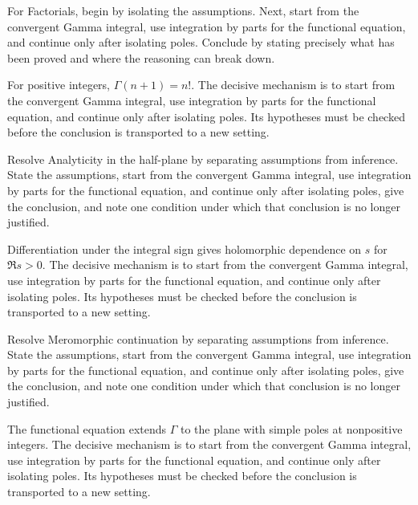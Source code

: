 \begin{problem}\label{prob:iv19-problem-04}
For Factorials, begin by isolating the assumptions. Next, start from the convergent Gamma integral, use integration by parts for the functional equation, and continue only after isolating poles. Conclude by stating precisely what has been proved and where the reasoning can break down.
\end{problem}
\begin{solution}
For positive integers, $\Gamma(n+1)=n!$. The decisive mechanism is to start from the convergent Gamma integral, use integration by parts for the functional equation, and continue only after isolating poles. Its hypotheses must be checked before the conclusion is transported to a new setting.
\end{solution}

\begin{problem}\label{prob:iv19-problem-05}
Resolve Analyticity in the half-plane by separating assumptions from inference. State the assumptions, start from the convergent Gamma integral, use integration by parts for the functional equation, and continue only after isolating poles, give the conclusion, and note one condition under which that conclusion is no longer justified.
\end{problem}
\begin{solution}
Differentiation under the integral sign gives holomorphic dependence on $s$ for $\Re s>0$. The decisive mechanism is to start from the convergent Gamma integral, use integration by parts for the functional equation, and continue only after isolating poles. Its hypotheses must be checked before the conclusion is transported to a new setting.
\end{solution}

\begin{problem}\label{prob:iv19-problem-06}
Resolve Meromorphic continuation by separating assumptions from inference. State the assumptions, start from the convergent Gamma integral, use integration by parts for the functional equation, and continue only after isolating poles, give the conclusion, and note one condition under which that conclusion is no longer justified.
\end{problem}
\begin{solution}
The functional equation extends $\Gamma$ to the plane with simple poles at nonpositive integers. The decisive mechanism is to start from the convergent Gamma integral, use integration by parts for the functional equation, and continue only after isolating poles. Its hypotheses must be checked before the conclusion is transported to a new setting.
\end{solution}

